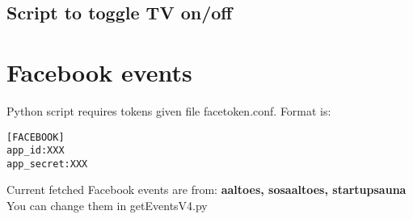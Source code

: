 \documentclass{article}
\begin{document}
\subsection{Script to toggle TV on/off}

\section{Facebook events}
Python script requires tokens given file facetoken.conf. Format is:
\begin{verbatim}
[FACEBOOK]
app_id:XXX
app_secret:XXX
\end{verbatim}
Current fetched Facebook events are from: \textbf{aaltoes, sosaaltoes, startupsauna}
You can change them in getEventsV4.py
\end{document}
